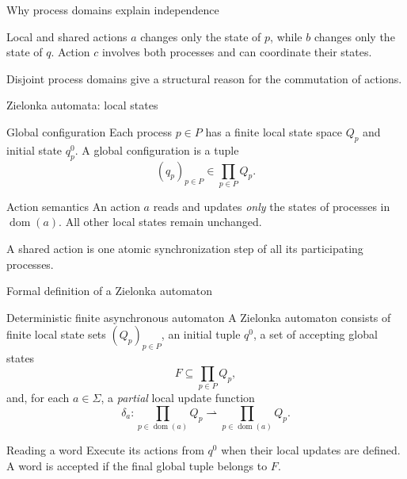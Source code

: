 \documentclass[t,11pt]{beamer}
\newcommand{\domn}{\operatorname{dom}}
\begin{document}
\begin{frame}{Why process domains explain independence}
  \begin{center}
  \end{center}
  \begin{block}{Local and shared actions}
    $a$ changes only the state of $p$, while $b$ changes only the state of $q$. Action $c$ involves both processes and can coordinate their states.
  \end{block}
  \vspace{0.15cm}
  Disjoint process domains give a structural reason for the commutation of actions.
\end{frame}

\begin{frame}{Zielonka automata: local states}
  \begin{block}{Global configuration}
    Each process $p\in P$ has a finite local state space $Q_p$ and initial state $q_p^0$. A global configuration is a tuple
    \[
        (q_p)_{p\in P}\in\prod_{p\in P}Q_p.
    \]
  \end{block}
  \begin{block}{Action semantics}
    An action $a$ reads and updates \emph{only} the states of processes in $\domn(a)$. All other local states remain unchanged.
  \end{block}
  \vspace{0.18cm}
  A shared action is one atomic synchronization step of all its participating processes.
\end{frame}

\begin{frame}{Formal definition of a Zielonka automaton}
  \begin{block}{Deterministic finite asynchronous automaton}
    A Zielonka automaton consists of finite local state sets $(Q_p)_{p\in P}$, an initial tuple $q^0$, a set of accepting global states
    \[
      F\subseteq\prod_{p\in P}Q_p,
    \]
    and, for each $a\in\Sigma$, a \emph{partial} local update function
    \[
      \delta_a:\prod_{p\in\domn(a)}Q_p
      \rightharpoonup\prod_{p\in\domn(a)}Q_p.
    \]
  \end{block}
  \begin{block}{Reading a word}
    Execute its actions from $q^0$ when their local updates are defined. A word is accepted if the final global tuple belongs to $F$.
  \end{block}
\end{frame}
\end{document}
